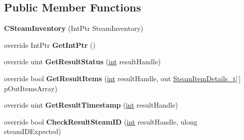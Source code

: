 \subsection*{Public Member Functions}
\begin{DoxyCompactItemize}
\item 
\hypertarget{classValve_1_1Steamworks_1_1CSteamInventory_ac8c94b9abd42a4bcf13f7843d61542b0}{}{\bfseries C\+Steam\+Inventory} (Int\+Ptr Steam\+Inventory)\label{classValve_1_1Steamworks_1_1CSteamInventory_ac8c94b9abd42a4bcf13f7843d61542b0}

\item 
\hypertarget{classValve_1_1Steamworks_1_1CSteamInventory_ac898a252dcb15d49ea8bc05225d37138}{}override Int\+Ptr {\bfseries Get\+Int\+Ptr} ()\label{classValve_1_1Steamworks_1_1CSteamInventory_ac898a252dcb15d49ea8bc05225d37138}

\item 
\hypertarget{classValve_1_1Steamworks_1_1CSteamInventory_a7992ee22d0a2e3dc51c8d3e9a2a352e0}{}override uint {\bfseries Get\+Result\+Status} (\hyperlink{SDL__thread_8h_a6a64f9be4433e4de6e2f2f548cf3c08e}{int} result\+Handle)\label{classValve_1_1Steamworks_1_1CSteamInventory_a7992ee22d0a2e3dc51c8d3e9a2a352e0}

\item 
\hypertarget{classValve_1_1Steamworks_1_1CSteamInventory_a93d0863603c636fd4319347411a6caaf}{}override bool {\bfseries Get\+Result\+Items} (\hyperlink{SDL__thread_8h_a6a64f9be4433e4de6e2f2f548cf3c08e}{int} result\+Handle, out \hyperlink{structValve_1_1Steamworks_1_1SteamItemDetails__t}{Steam\+Item\+Details\+\_\+t}\mbox{[}$\,$\mbox{]} p\+Out\+Items\+Array)\label{classValve_1_1Steamworks_1_1CSteamInventory_a93d0863603c636fd4319347411a6caaf}

\item 
\hypertarget{classValve_1_1Steamworks_1_1CSteamInventory_a3f9c87537faca2e398d22e09b93776d9}{}override uint {\bfseries Get\+Result\+Timestamp} (\hyperlink{SDL__thread_8h_a6a64f9be4433e4de6e2f2f548cf3c08e}{int} result\+Handle)\label{classValve_1_1Steamworks_1_1CSteamInventory_a3f9c87537faca2e398d22e09b93776d9}

\item 
\hypertarget{classValve_1_1Steamworks_1_1CSteamInventory_a84ea1c6270e22785ca032ae46d000b02}{}override bool {\bfseries Check\+Result\+Steam\+I\+D} (\hyperlink{SDL__thread_8h_a6a64f9be4433e4de6e2f2f548cf3c08e}{int} result\+Handle, ulong steam\+I\+D\+Expected)\label{classValve_1_1Steamworks_1_1CSteamInventory_a84ea1c6270e22785ca032ae46d000b02}


\end{DoxyCompactItemize}
